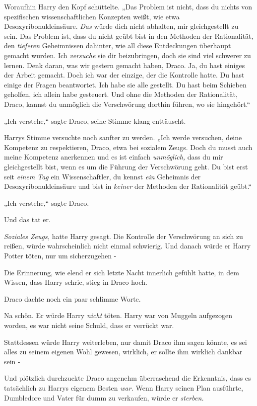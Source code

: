{Woraufhin Harry den Kopf schüttelte. „Das Problem ist nicht, dass du nichts von spezifischen wissenschaftlichen Konzepten weißt, wie etwa Desoxyribonukleinsäure. \emph{Das} würde dich nicht abhalten, mir gleichgestellt zu sein. Das Problem ist, dass du nicht geübt bist in den Methoden der Rationalität, den \emph{tieferen} Geheimnissen dahinter, wie all diese Entdeckungen überhaupt gemacht wurden. Ich \emph{versuche} sie dir beizubringen, doch sie sind viel schwerer zu lernen. Denk daran, was wir gestern gemacht haben, Draco. Ja, du hast einiges der Arbeit gemacht. Doch ich war der einzige, der die Kontrolle hatte. Du hast einige der Fragen beantwortet. Ich habe sie alle gestellt. Du hast beim Schieben geholfen, ich allein habe gesteuert. Und ohne die Methoden der Rationalität, Draco, kannst du unmöglich die Verschwörung dorthin führen, wo sie hingehört.“

„Ich verstehe,“ sagte Draco, seine Stimme klang enttäuscht.

Harrys Stimme versuchte noch sanfter zu werden. „Ich werde versuchen, deine Kompetenz zu respektieren, Draco, etwa bei sozialem Zeugs. Doch du musst auch meine Kompetenz anerkennen und es ist einfach \emph{unmöglich,} dass du mir gleichgestellt bist, wenn es um die Führung der Verschwörung geht. Du bist erst seit \emph{einem Tag} ein Wissenschaftler, du kennst \emph{ein} Geheimnis der Desoxyribonukleinsäure und bist in \emph{keiner} der Methoden der Rationalität geübt.“

„Ich verstehe,“ sagte Draco.

Und das tat er.

\emph{Soziales Zeugs,} hatte Harry gesagt. Die Kontrolle der Verschwörung an sich zu reißen, würde wahrscheinlich nicht einmal schwierig. Und danach würde er Harry Potter töten, nur um sicherzugehen -

Die Erinnerung, wie elend er sich letzte Nacht innerlich gefühlt hatte, in dem Wissen, dass Harry schrie, stieg in Draco hoch.

Draco dachte noch ein paar schlimme Worte.

Na schön. Er würde Harry \emph{nicht} töten. Harry war von Muggeln aufgezogen worden, es war nicht seine Schuld, dass er verrückt war.

Stattdessen würde Harry weiterleben, nur damit Draco ihm sagen könnte, es sei alles zu seinem eigenen Wohl gewesen, wirklich, er sollte ihm wirklich dankbar sein -

Und plötzlich durchzuckte Draco angenehm überraschend die Erkenntnis, dass es tatsächlich zu Harrys eigenem Besten \emph{war.} Wenn Harry seinen Plan ausführte, Dumbledore und Vater für dumm zu verkaufen, würde er \emph{sterben.}

}
